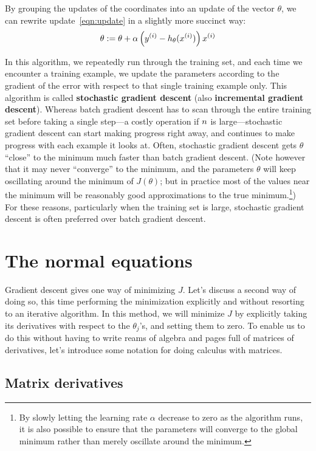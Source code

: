 \documentclass{article}
\begin{document}
By grouping the updates of the coordinates into an update of the vector $\theta$, we can rewrite update~\eqref{eqn:update} in a slightly more succinct way:
\begin{align}
\theta := \theta + \alpha \left({y^{(i)}} - h_\theta({x^{(i)}})\right) x^{(i)} \nonumber
\end{align}

In this algorithm, we repeatedly run through the training set, and
each time we encounter a training example, we update the parameters
according to the gradient of the error with respect to that single training
example only.  This algorithm is called {\bf stochastic gradient descent}
(also {\bf incremental gradient descent}).
Whereas batch gradient descent has to scan through the entire training set
before taking a single step---a costly operation if ${n}$ is large---stochastic
gradient descent can start making progress right away, and continues to make
progress with each example it looks at.  Often, stochastic gradient descent
gets $\theta$ ``close'' to the minimum much faster than batch
gradient descent.  (Note however that it may never ``converge'' to the minimum,
and the parameters $\theta$ will keep oscillating around the minimum
of $J(\theta)$; but in practice most of the values near the minimum will be
reasonably good approximations to the true minimum.\footnote{By slowly letting the learning rate $\alpha$
decrease to zero as the algorithm runs, it is also possible to ensure that
the parameters will converge to the global minimum rather than merely oscillate
around the minimum.})  For these reasons, particularly when the training
set is large, stochastic gradient descent is often preferred over batch
gradient descent.

\section{The normal equations}

Gradient descent gives one way of minimizing $J$.  Let's discuss a second
way of doing so, this time performing the minimization explicitly
and without resorting to an iterative algorithm.  In this method, we will
minimize $J$ by explicitly taking its derivatives with respect to the $\theta_j$'s,
and setting them to zero.  To enable us to do this without having to write reams
of algebra and pages full of matrices of derivatives, let's introduce some
notation for doing calculus with matrices.

\subsection{Matrix derivatives}
\end{document}
